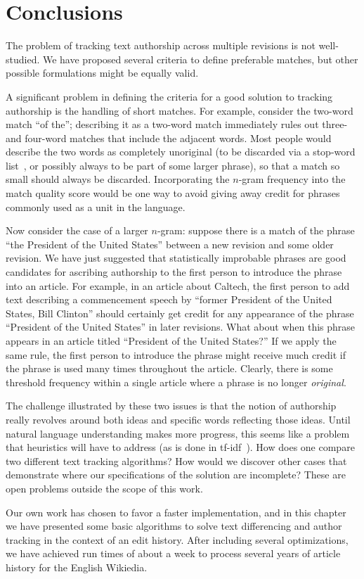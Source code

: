 \section{Conclusions}

The problem of tracking text authorship across multiple revisions
is not well-studied.
We have proposed several criteria to define preferable matches,
but other possible formulations
might be equally valid.

A significant problem in defining the criteria for a
good solution to tracking authorship is the handling of short matches.
For example, consider the two-word match ``of the''; describing
it as a two-word match immediately rules out three- and four-word
matches that include the adjacent words.
Most people would describe the two words as completely
unoriginal (to be discarded via a stop-word list~\cite{Kinzler2011},
or possibly always to be part of some larger phrase),
so that a match so small should always be discarded.
Incorporating the $n$-gram frequency into the match quality
score would be one way to avoid giving away credit for phrases
commonly used as a unit in the language.

Now consider the case of a larger $n$-gram: suppose there is a match
of the phrase ``the President of the United States'' between a new
revision and some older revision.
We have just suggested that statistically improbable phrases are
good candidates for ascribing authorship to the first person to
introduce the phrase into an article.
For example, in an article about Caltech, the first person to
add text describing a commencement speech by ``former President of
the United States, Bill Clinton'' should certainly get credit for
any appearance of the phrase ``President of the United States''
in later revisions.
What about when this phrase appears in an article titled
``President of the United States?''
If we apply the same rule, the first person to introduce the phrase
might receive much credit if the phrase is used many times throughout
the article.
Clearly, there is some threshold frequency within a single
article where a phrase is no longer \textit{original}.

The challenge illustrated by these two issues is that the notion
of authorship really revolves around both ideas and specific
words reflecting those ideas.
Until natural language understanding makes more progress, this seems
like a problem that heuristics will have to address
(\eg as is done in tf-idf~\cite{Jones1972}).
How does one compare two different text tracking algorithms?
How would we discover other cases that demonstrate where our
specifications of the solution are incomplete?
These are open problems outside the scope of this work.

Our own work has chosen to favor a faster implementation, and
in this chapter we have presented some basic algorithms to solve text
differencing and author tracking in the context of an edit history.
After including several optimizations, we have achieved run times
of about a week to process several years of article history for
the English Wikiedia.


